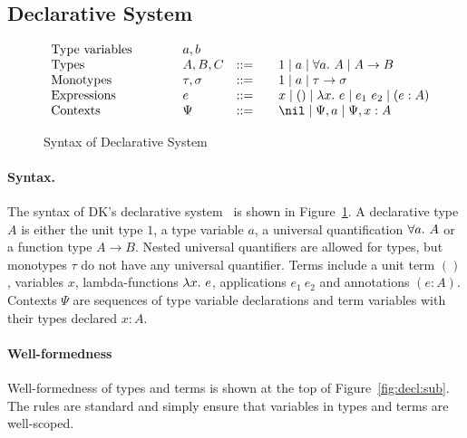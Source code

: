 \subsection{Declarative System}\label{subsec:dk:decl}

\begin{figure}[t]
\[
\begin{array}{l@{\qquad}lcl}
\text{Type variables}\qquad&a, b
\\
\text{Types}\qquad&A, B, C &::=&\quad 1 \mid a \mid \all A \mid A\to B\\
\text{Monotypes}\qquad&\tau,\sigma &::=&\quad 1 \mid a \mid \tau\to \sigma
\\
\text{Expressions}\qquad&e &::=&\quad x \mid () \mid \lam e \mid e_1~e_2 \mid (e:A)
\\
\text{Contexts}\qquad&\Psi &::=&\quad \nil \mid \Psi, a \mid \Psi, x:A
\end{array}
\]
\caption{Syntax of Declarative System}\label{fig:decl:syntax}
\end{figure}

\paragraph{Syntax.}
The syntax of DK's declarative system~\citep{dunfield2013complete} is shown in Figure~\ref{fig:decl:syntax}.
A declarative type $A$ is either the unit type $1$, a type variable $a$,
a universal quantification $\all A$ or a function type $A \to B$.
Nested universal quantifiers are allowed for types,
but monotypes $\tau$ do not have any universal quantifier.
Terms include a unit term $()$, variables $x$, lambda-functions $\lam e$,
applications $e_1~e_2$ and annotations $(e:A)$.
Contexts $\Psi$ are sequences of type variable declarations and
term variables with their types declared $x:A$.

\paragraph{Well-formedness} Well-formedness of types and terms is 
shown at the top of Figure~\ref{fig:decl:sub}. The rules are standard
and simply ensure that variables in types and terms are well-scoped.  

